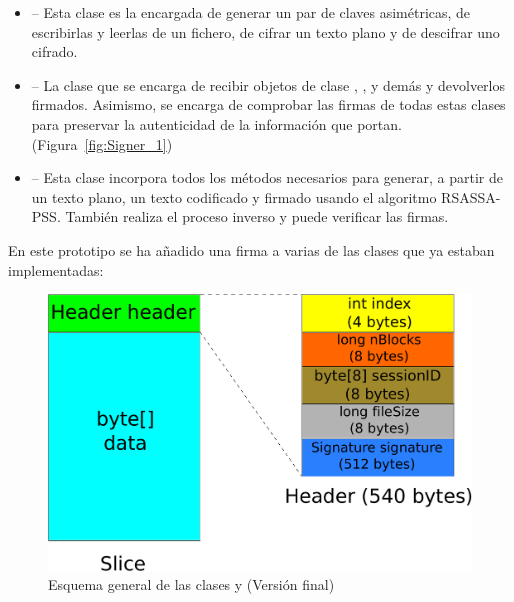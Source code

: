 \begin{itemize}
  \item {} -- Esta clase es la encargada de generar un par de claves asimétricas, de escribirlas y leerlas de un fichero, de cifrar un texto plano y de descifrar uno cifrado.

  \item {} -- La clase que se encarga de recibir objetos de clase , ,  y demás y devolverlos firmados. Asimismo, se encarga de comprobar las firmas de todas estas clases para preservar la autenticidad de la información que portan. (Figura~\ref{fig:Signer_1})

  \item {} -- Esta clase incorpora todos los métodos necesarios para generar, a partir de un texto plano, un texto codificado y firmado usando el algoritmo RSASSA-PSS. También realiza el proceso inverso y puede verificar las firmas.
\end{itemize}

En este prototipo se ha añadido una firma a varias de las clases que ya estaban implementadas:

\begin{figure}[!htb]
  \centering
  \includegraphics[scale=0.4]{Figures/Slice_Header_2}
  \decoRule
  \caption[ -  (Versión final)]{Esquema general de las clases  y  (Versión final)}
  \label{fig:Slice_Header_2}
\end{figure}

